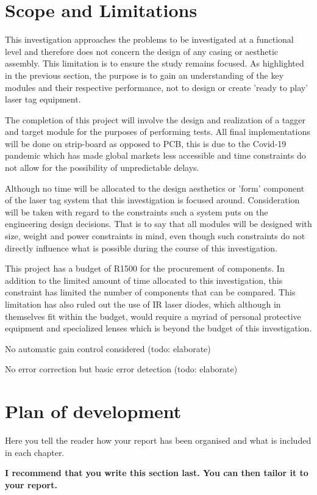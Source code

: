 \section{Scope and Limitations}

This investigation approaches the problems to be investigated at a functional level and therefore does not concern the design of any casing or aesthetic assembly. This limitation is to ensure the study remains focused. As highlighted in the previous section, the purpose is to gain an understanding of the key modules and their respective performance, not to design or create 'ready to play' laser tag equipment.

The completion of this project will involve the design and realization of a tagger and target module for the purposes of performing tests. All final implementations will be done on strip-board as opposed to PCB, this is due to the Covid-19 pandemic which has made global markets less accessible and time constraints do not allow for the possibility of unpredictable delays.

Although no time will be allocated to the design aesthetics or 'form' component of the laser tag system that this investigation is focused around. Consideration will be taken with regard to the constraints such a system puts on the engineering design decisions. That is to say that all modules will be designed with size, weight and power constraints in mind, even though such constraints do not directly influence what is possible during the course of this investigation.

This project has a budget of R1500 for the procurement of components. In addition to the limited amount of time allocated to this investigation, this constraint has limited the number of components that can be compared. This limitation has also ruled out the use of IR laser diodes, which although in themselves fit within the budget, would require a myriad of personal protective equipment and specialized lenses which is beyond the budget of this investigation.

No automatic gain control considered (todo: elaborate)

No error correction but basic error detection (todo: elaborate)





\section{Plan of development}
Here you tell the reader how your report has been organised and what is included in each
chapter.

{\bf I recommend that you write this section last. You can then tailor it to your report.}
